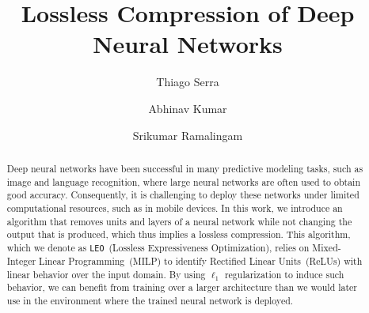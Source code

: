 \documentclass[runningheads]{llncs}
\begin{document}
\title{Lossless Compression of Deep Neural Networks}
\author{Thiago Serra\and
Abhinav Kumar
\and
Srikumar Ramalingam} 
\maketitle              

\begin{abstract}
Deep neural networks have been successful in many predictive modeling tasks, such as image and language recognition,  where large neural networks are often used to obtain good accuracy. 
Consequently, 
it is challenging to deploy these networks under 
limited computational resources, such as in mobile devices. 
In this work, we introduce an algorithm that 
removes units and layers of a neural network 
while not changing the output that 
is produced, 
which thus implies a lossless compression. 
This algorithm, which we denote as \texttt{LEO}~(Lossless Expressiveness Optimization), relies on Mixed-Integer Linear Programming~(MILP) to identify Rectified Linear Units~(ReLUs) with  linear behavior over the input domain. 
By using $\ell_1$ regularization to induce such behavior, 
we can benefit from training over a larger architecture than we would later use in the environment where the trained neural network is deployed. 

\end{abstract}
 
\end{document}

